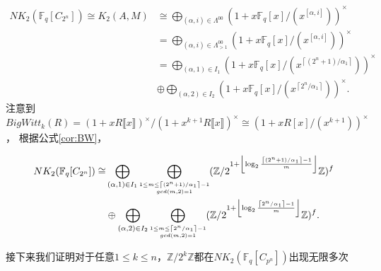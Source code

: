 \begin{align*}
NK_2(\mathbb{F}_q[C_{2^n}])\cong K_2(A,M) &\cong \bigoplus_{(\alpha,i)\in\Lambda^{00}}(1+x\mathbb{F}_q[x]/(x^{[\alpha,i]}))^{\times}\\
& = \bigoplus_{(\alpha,i)\in \Lambda^{00}_{>1}}(1+x\mathbb{F}_q[x]/(x^{[\alpha,i]}))^{\times}\\
& = \bigoplus_{(\alpha,1)\in I_1}(1+x\mathbb{F}_q[x]/(x^{\left \lceil (2^n+1)/\alpha_1 \right \rceil}))^{\times} \\
& \oplus \bigoplus_{(\alpha,2)\in I_2}(1+x\mathbb{F}_q[x]/(x^{\left \lceil 2^n/\alpha_1 \right \rceil}))^{\times}.
\end{align*}
注意到$BigWitt_{k}(R)=(1+x R\llbracket x\rrbracket )^{\times}/(1+x^{k+1} R\llbracket x\rrbracket )^{\times} \cong (1+x R[x]/(x^{k+1}))^{\times}$，
根据公式\ref{cor:BW}，


\begin{align*}
NK_2(\mathbb{F}_q[C_{2^n}])\cong & \bigoplus_{(\alpha,1)\in I_1}\bigoplus_{\scriptsize\substack{1\leq m\leq \left \lceil (2^n+1)/\alpha_1 \right \rceil-1 \\ gcd(m,2)=1}}(\mathbb{Z}/2^{1+ \left \lfloor\log_2 \frac{\left \lceil (2^n+1)/\alpha_1 \right \rceil-1}{m}  \right \rfloor}\mathbb{Z})^f \\
& \oplus \bigoplus_{(\alpha,2)\in I_2}\bigoplus_{\scriptsize\substack{ 1 \leq m\leq \left \lceil 2^n/\alpha_1 \right \rceil-1 \\ gcd(m,2)=1}}(\mathbb{Z}/2^{1+ \left \lfloor\log_2 \frac{\left \lceil 2^n/\alpha_1 \right \rceil-1}{m}  \right \rfloor}\mathbb{Z})^f.
\end{align*}

接下来我们证明对于任意$1\leq k\leq n$，$\mathbb{Z}/2^k \mathbb{Z}$都在$NK_2(\mathbb{F}_q[C_{p^n}])$出现无限多次

